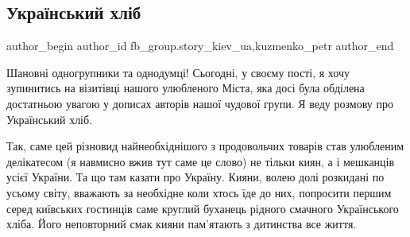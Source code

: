  
 
 
 
 
 
\subsection{Український хліб}
\label{sec:31_03_2021.fb.fb_group.story_kiev_ua.1.ukr_hleb}
 
\ifcmt
 author_begin
   author_id fb_group.story_kiev_ua,kuzmenko_petr
 author_end
\fi

Шановні одногрупники та однодумці! Сьогодні, у своєму пості, я хочу зупинитись
на візитівці нашого улюбленого Міста, яка досі була обділена достатньою увагою
у дописах авторів нашої чудової групи. Я веду розмову про Український хліб.

Так, саме цей різновид найнеобхіднішого з продовольчих товарів став улюбленим
делікатесом (я навмисно вжив тут саме це слово) не тільки киян, а і мешканців
усієї України. Та що там казати про Україну. Кияни, волею долі розкидані по
усьому світу, вважають за необхідне коли хтось їде до них, попросити першим
серед київських гостинців саме круглий буханець рідного смачного Українського
хліба. Його неповторний смак кияни пам'ятають з дитинства все життя. 

\begin{multicols}{2} %
\setlength{\parindent}{0pt}




\end{multicols} %

